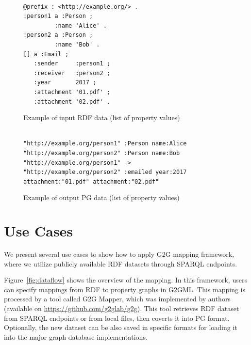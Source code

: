 \documentclass[runningheads]{llncs}
\begin{document}
\begin{figure}[!t]
\begin{scriptsize}
\begin{verbatim}

@prefix : <http://example.org/> .
:person1 a :Person ;
         :name 'Alice' .
:person2 a :Person ;
         :name 'Bob' .
[] a :Email ;
   :sender     :person1 ;
   :receiver   :person2 ;
   :year       2017 ;
   :attachment '01.pdf' ;
   :attachment '02.pdf' .

\end{verbatim}
\end{scriptsize}
\caption{Example of input RDF data (list of property values)}
\label{fig:example-rdf3}
\end{figure}


\begin{figure}[!t]
\begin{scriptsize}
\begin{verbatim}

"http://example.org/person1" :Person name:Alice
"http://example.org/person2" :Person name:Bob
"http://example.org/person1" -> "http://example.org/person2" :emailed year:2017 attachment:"01.pdf" attachment:"02.pdf"

\end{verbatim}
\end{scriptsize}
\caption{Example of output PG data (list of property values)}
\label{fig:example-pg3}
\end{figure}



\section{Use Cases}
 
We present several use cases to show how to apply G2G mapping framework, where we utilize publicly available RDF datasets through SPARQL endpoints.
 
Figure~\ref{fig:dataflow} shows the overview of the mapping.
In this framework, users can specify mappings from RDF to property graphs in G2GML.
This mapping is processed by a tool called G2G Mapper, which was implemented by authors (available on \url{https://github.com/g2glab/g2g}). This tool retrieves RDF dataset from SPARQL endpoints or from local files, then coverts it into PG format. Optionally, the new dataset can be also saved in specific formats for loading it into the major graph database implementations.
 
\end{document}
